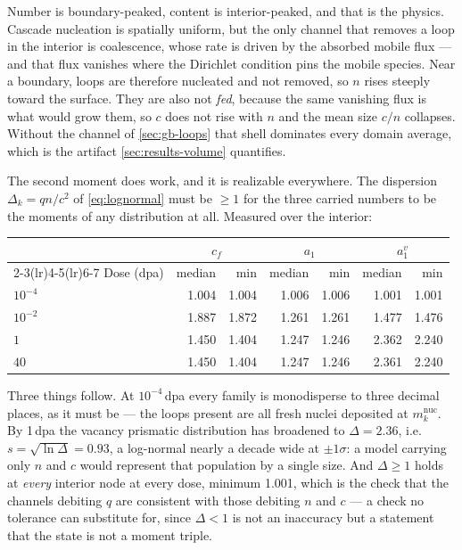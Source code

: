 Number is boundary-peaked, content is interior-peaked, and that is the physics.
Cascade nucleation is spatially uniform, but the only channel that removes a
loop in the interior is coalescence, whose rate is driven by the absorbed mobile
flux --- and that flux vanishes where the Dirichlet condition pins the mobile
species. Near a boundary, loops are therefore nucleated and not removed, so $n$
rises steeply toward the surface. They are also not \emph{fed}, because the same
vanishing flux is what would grow them, so $c$ does not rise with $n$ and the
mean size $c/n$ collapses. Without the channel of \cref{sec:gb-loops} that shell
dominates every domain average, which is the artifact \cref{sec:results-volume}
quantifies.

The second moment does work, and it is realizable everywhere. The dispersion
$\Delta_k=q n/c^{2}$ of \cref{eq:lognormal} must be $\ge1$ for the three carried
numbers to be the moments of any distribution at all. Measured over the
interior:

\begin{center}
\begin{tabular}{@{}lrrrrrr@{}}
\toprule
& \multicolumn{2}{c}{$c_f$} & \multicolumn{2}{c}{$a_1$}
& \multicolumn{2}{c}{$a_1^{v}$} \\
\cmidrule(lr){2-3}\cmidrule(lr){4-5}\cmidrule(lr){6-7}
Dose (dpa) & median & min & median & min & median & min \\
\midrule
$10^{-4}$ & 1.004 & 1.004 & 1.006 & 1.006 & 1.001 & 1.001 \\
$10^{-2}$ & 1.887 & 1.872 & 1.261 & 1.261 & 1.477 & 1.476 \\
$1$       & 1.450 & 1.404 & 1.247 & 1.246 & 2.362 & 2.240 \\
$40$      & 1.450 & 1.404 & 1.247 & 1.246 & 2.361 & 2.240 \\
\bottomrule
\end{tabular}
\end{center}

Three things follow. At $10^{-4}\,$dpa every family is monodisperse to three
decimal places, as it must be --- the loops present are all fresh nuclei
deposited at $m^{\mathrm{nuc}}_k$. By 1\,dpa the vacancy prismatic distribution
has broadened to $\Delta=2.36$, i.e. $s=\sqrt{\ln\Delta}=0.93$, a log-normal
nearly a decade wide at $\pm1\sigma$: a model carrying only $n$ and $c$ would
represent that population by a single size. And $\Delta\ge1$ holds at
\emph{every} interior node at every dose, minimum 1.001, which is the check that
the channels debiting $q$ are consistent with those debiting $n$ and $c$ --- a
check no tolerance can substitute for, since $\Delta<1$ is not an inaccuracy but
a statement that the state is not a moment triple.

